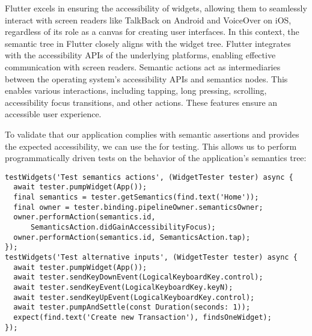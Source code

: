 \noindent Flutter excels in ensuring the accessibility of widgets, allowing them to seamlessly interact with screen 
readers like TalkBack on Android and VoiceOver on iOS, regardless of its role as a canvas for creating user interfaces. 
In this context, the semantic tree in Flutter closely aligns with the widget tree. Flutter integrates with the 
accessibility APIs of the underlying platforms, enabling effective communication with screen readers. Semantic actions 
act as intermediaries between the operating system's accessibility APIs and semantics nodes. This enables various 
interactions, including tapping, long pressing, scrolling, accessibility focus transitions, and other actions. These 
features ensure an accessible user experience.

To validate that our application complies with semantic assertions and provides the expected accessibility, we can use 
the  for testing. This allows us to perform programmatically driven tests on the behavior of the 
application's semantics tree:

\begin{lstlisting}
testWidgets('Test semantics actions', (WidgetTester tester) async {
  await tester.pumpWidget(App());
  final semantics = tester.getSemantics(find.text('Home'));
  final owner = tester.binding.pipelineOwner.semanticsOwner;
  owner.performAction(semantics.id,
      SemanticsAction.didGainAccessibilityFocus);
  owner.performAction(semantics.id, SemanticsAction.tap);
});
testWidgets('Test alternative inputs', (WidgetTester tester) async {
  await tester.pumpWidget(App());
  await tester.sendKeyDownEvent(LogicalKeyboardKey.control);
  await tester.sendKeyEvent(LogicalKeyboardKey.keyN);
  await tester.sendKeyUpEvent(LogicalKeyboardKey.control);
  await tester.pumpAndSettle(const Duration(seconds: 1));
  expect(find.text('Create new Transaction'), findsOneWidget);
});
\end{lstlisting}

